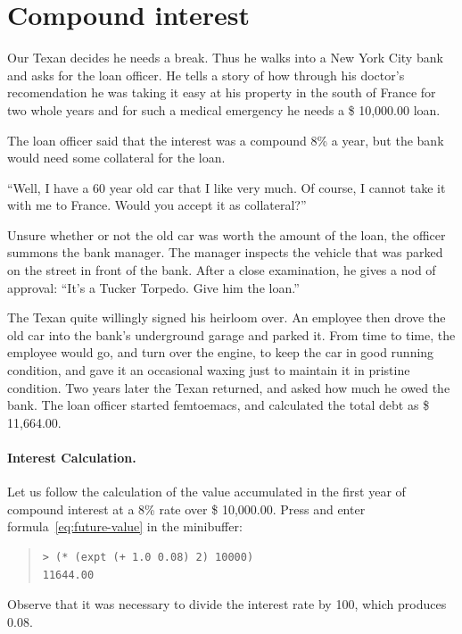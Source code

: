 \documentclass[a4paper,12pt]{book}
\begin{document}
\section{Compound interest}

Our Texan decides he needs a break. Thus he walks into
a New York City bank and asks for the loan officer.
He tells a story of how through his doctor's recomendation
he was taking it easy at his property in the south of
France for two whole years and for such a medical
emergency he needs a \$ 10,000.00 loan.

The loan officer said that the interest was a compound 8\%
a year, but the bank would need some collateral for the loan.

“Well, I have a 60 year old car that I like very much.
Of course, I cannot take it with me to France.
Would you accept it as collateral?”

Unsure whether or not the old car was worth the
amount of the loan, the officer summons the bank manager.
The manager inspects the vehicle that was parked on the
street in front of the bank. After a close examination,
he gives a nod of approval: “It’s a Tucker Torpedo.
Give him the loan.”

The Texan quite willingly signed his heirloom over.
An employee then drove the old car into the bank’s
underground garage and parked it. From time to time,
the employee would go, and turn over the engine, to keep
the car in good running condition, and gave it an
occasional waxing just to maintain it in pristine condition.
Two years later the Texan returned, and asked how
much he owed the bank. The loan officer started femtoemacs,
and calculated the total debt as \$ 11,664.00.

\paragraph{Interest Calculation.}
Let us follow the calculation of the value accumulated
in the first year of compound interest at a 8\% rate
over \$ 10,000.00. Press  and
enter formula~\ref{eq:future-value} in the minibuffer:
\begin{quote}
\begin{verbatim}
> (* (expt (+ 1.0 0.08) 2) 10000)
11644.00
\end{verbatim}
\end{quote}
Observe that it was necessary to divide the
interest rate by 100, which produces 0.08.
\end{document}
